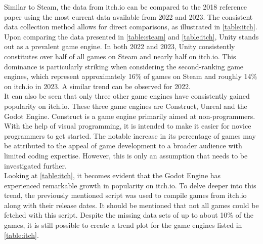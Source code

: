 Similar to Steam, the data from itch.io can be compared to the 2018 reference paper using the most current data available from 2022 and 2023.
The consistent data collection method allows for direct comparisons, as illustrated in \autoref{table:itch}.
Upon comparing the data presented in \autoref{table:steam} and \autoref{table:itch}, Unity stands out as a prevalent game engine.
In both 2022 and 2023, Unity consistently constitutes over half of all games on Steam and nearly half on itch.io.
This dominance is particularly striking when considering the second-ranking game engines, which represent approximately 16\% of games on Steam and roughly 14\% on itch.io in 2023.
A similar trend can be observed for 2022. \\

It can also be seen that only three other game engines have consistently gained popularity on itch.io.
These three game engines are Construct, Unreal and the Godot Engine.
Construct is a game engine primarily aimed at non-programmers.
With the help of visual programming, it is intended to make it easier for novice programmers to get started.
The notable increase in its percentage of games may be attributed to the appeal of game development to a broader audience with limited coding expertise.
However, this is only an assumption that needs to be investigated further. \\

Looking at \autoref{table:itch}, it becomes evident that the Godot Engine has experienced remarkable growth in popularity on itch.io.
To delve deeper into this trend, the previously mentioned script was used to compile games from itch.io along with their release dates.
It should be mentioned that not all games could be fetched with this script.
Despite the missing data sets of up to about 10\% of the games, it is still possible to create a trend plot for the game engines listed in \autoref{table:itch}.

